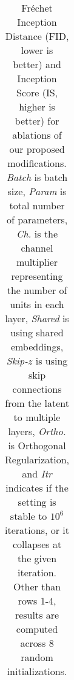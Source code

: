 \begin{table}[tbp]
\begin{center}
\begin{tabular}{c|c|c|c|c|c|c|c|c}
\hline

\end{tabular}
\end{center}

\caption{\label{ablation_table} Fr\'echet Inception Distance (FID, lower is better) and Inception Score (IS, higher is better) for ablations of our proposed modifications. \textit{Batch} is batch size, \textit{Param} is total number of parameters, \textit{Ch.} is the channel multiplier representing the number of units in each layer, \textit{Shared} is using shared embeddings, 
\textit{Skip-$z$} is using skip connections from the latent to multiple layers, 
\textit{Ortho.} is Orthogonal Regularization, and \textit{Itr} indicates if the setting is stable to $10^6$ iterations, or it collapses at the given iteration. Other than rows 1-4, results are computed across 8 random initializations.
}
\end{table}